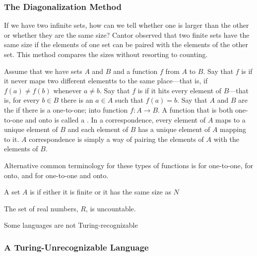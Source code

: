 \documentclass{article}
\begin{document}
\subsubsection{The Diagonalization Method}

If we have two infinite sets, how can we tell whether one is larger than the other or whether they are the same size? Cantor observed that two finite sets have the same size if the elements of one set can be paired with the elements of the other set. This method compares the sizes without resorting to counting. 

\begin{definition}[Diagonalization]
  Assume that we have sets $A$ and $B$ and a function $f$ from $A$ to $B$. Say that $f$ is  if it never maps two different elementts to the same place---that is, if $f(a) \neq f(b)$ whenever $a \neq b$. Say that $f$ is  if it hits every element of $B$---that is, for every $b \in B$ there is an $a \in A$ such that $f(a) =b$. Say that $A$ and $B$ are the  if there is a one-to-one; into function $f:A \rightarrow B$. A function that is both one-to-one and onto is called a . In a correspondence, every element of $A$ maps to a unique element of $B$ and each element of $B$ has a unique element of $A$ mapping to it. $A$ correspondence is simply a way of pairing the elements of $A$ with the elements of $B$. 
\end{definition}

Alternative common terminology for these types of functions is  for one-to-one,  for onto, and  for one-to-one and onto. 

\begin{definition}[Countability]
  A set $A$ is  if either it is finite or it has the same size as $N$
\end{definition}

\begin{theorem}
  The set of real numbers, $R$, is uncountable. 
\end{theorem}

\begin{theorem}
  Some languages are not Turing-recognizable
\end{theorem}

\subsubsection{A Turing-Unrecognizable Language}
\end{document}

